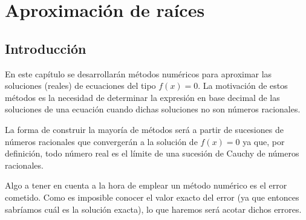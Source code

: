 \chapter{Aproximaci{\'o}n de ra{\'i}ces}
    \section{Introducción}
    \justifying 
    En este capítulo se desarrollarán métodos numéricos para aproximar las soluciones (reales) de ecuaciones del tipo $f(x)=0$. La motivación de estos métodos es la necesidad de determinar la expresión en base decimal de las soluciones de una ecuación cuando dichas soluciones no son números racionales. 

    La forma de construir la mayoría de métodos será a partir de sucesiones de números racionales que convergerán a la solución de $f(x)=0$ ya que, por definición, todo número real es el límite de una sucesión de Cauchy de números racionales.

    Algo a tener en cuenta a la hora de emplear un método numérico es el error cometido. Como es imposible conocer el valor exacto del error (ya que entonces sabríamos cuál es la solución exacta), lo que haremos será acotar dichos errores. 
